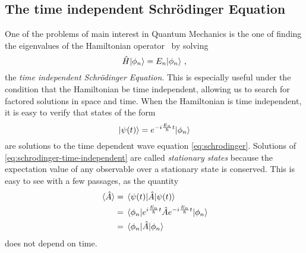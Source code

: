         \subsection{The time independent Schr\"odinger Equation}
            One of the problems of main interest in Quantum Mechanics is the one of finding the eigenvalues of the Hamiltonian operator \hH\ by solving 
            \begin{equation}
                \label{eq:schrodinger-time-independent}
                \hat{H}\!\ket{\phi_n} = E_n\!\ket{\phi_n}
                \,\text{,}
            \end{equation}
            the \emph{time independent Schr\"odinger Equation}.
            This is especially useful under the condition that the Hamiltonian be time independent, allowing us to search for factored solutions in space and time. When the Hamiltonian is time independent, it is easy to verify that states of the form
            \begin{equation*}
                \ket{\psi\pqty{t}} = \myexp{-i\frac{E_n}{\hbar}t}\!\ket{\phi_n}
            \end{equation*}
            are solutions to the time dependent wave equation \eqref{eq:schrodinger}. Solutions of \eqref{eq:schrodinger-time-independent} are called \emph{stationary states} because the expectation value of any observable over a stationary state is conserved. This is easy to see with a few passages, as the quantity
            \begin{align*}
                \ev*{\hA}
                &= \ev{\hA}{\psi\pqty{t}} \\
                &= \ev{\myexp{i\frac{E_n}{\hbar}t}\hA\myexp{-i\frac{E_n}{\hbar}t}}{\phi_n} \\
                &= \ev{\hA}{\phi_n}
            \end{align*}
            does not depend on time.

